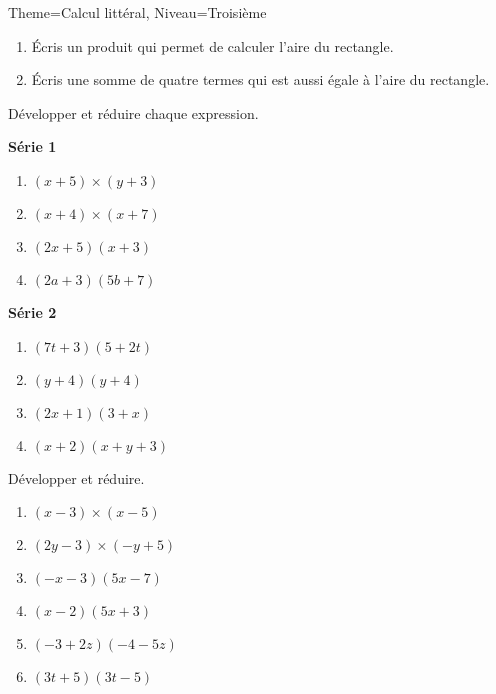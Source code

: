 \documentclass[11pt]{article}
\begin{document}
\begin{multicols}{2}
\begin{Maquette}[Fiche]{Theme=Calcul littéral, Niveau=Troisième}
\begin{exercice}
            \begin{enumerate}
                \item Écris un produit qui permet de calculer l’aire du rectangle.
                \item Écris une somme de quatre termes qui est aussi égale à l’aire du rectangle.
            \end{enumerate}
        \end{exercice}
        \columnbreak

        \begin{exercice}
            Développer et réduire chaque expression.

                \textbf{Série 1}

                \begin{enumerate}[label=\textbf{\alph*.}]
                    \item $(x+5) \times (y+3)$
                    \item $(x + 4)\times (x+7)$
                    \item $(2x+5)(x+3)$
                    \item $(2a + 3)(5b + 7)$
                \end{enumerate}

                \textbf{Série 2}
                
                \begin{enumerate}[label=\textbf{\alph*.}]
                    \item $(7t + 3)(5 + 2t)$
                    \item $(y + 4)(y+4)$
                    \item $(2x+1)(3+x)$
                    \item $(x+2)(x+y+3)$
                \end{enumerate}
        \end{exercice}
        
        \begin{exercice}
            Développer et réduire.
                 \begin{enumerate}[label=\textbf{\alph*.}]
                    \item $(x-3)\times (x - 5)$
                    \item $(2y - 3)\times (-y+5)$
                    \item $(-x-3)(5x-7)$
                    \item $(x-2)(5x+3)$
                    \item $(-3+2z)(-4-5z)$
                    \item $(3t+5)(3t-5)$
                \end{enumerate}
        \end{exercice}
    \end{Maquette}

\end{multicols}
\end{document}
